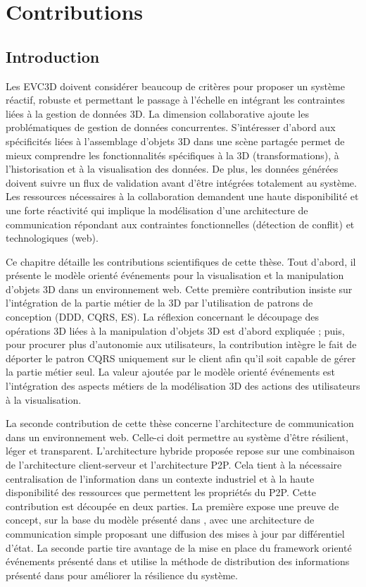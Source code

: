 \chapter{Contributions}
\chaptertable
\section{Introduction}
Les \gls{EVC3D} doivent considérer beaucoup de critères pour 
proposer un système réactif, robuste et permettant le passage à l'échelle en 
intégrant les contraintes liées à la gestion de données \gls{3D}. La dimension 
collaborative ajoute les problématiques de gestion de données concurrentes.
S'intéresser d'abord aux spécificités liées à 
l'assemblage d'objets \gls{3D} dans une scène partagée permet de 
mieux comprendre les fonctionnalités spécifiques à la \gls{3D} (transformations), 
à l'historisation et à la visualisation des données. De plus, les données générées
doivent suivre un flux de validation avant d'être intégrées totalement au système.
Les ressources nécessaires à la collaboration demandent une haute disponibilité 
et une forte réactivité qui implique la modélisation d'une architecture 
de communication répondant aux contraintes fonctionnelles (détection de conflit) 
et technologiques (web).

Ce chapitre détaille les contributions scientifiques de cette thèse.
Tout d'abord, il présente le modèle orienté événements pour la 
visualisation et la manipulation d'objets \gls{3D} dans un environnement web. 
Cette première contribution insiste sur l'intégration de la partie métier de la 
\gls{3D} par l'utilisation de
patrons de conception (\gls{DDD}, \gls{CQRS}, \gls{ES}). La réflexion concernant 
le découpage des opérations \gls{3D} liées à la manipulation d'objets \gls{3D} est 
d'abord expliquée ; puis, pour procurer plus d'autonomie 
aux utilisateurs, la contribution intègre le fait de déporter le patron \gls{CQRS} 
uniquement sur le client afin qu'il soit capable de gérer la partie métier seul. 
La valeur ajoutée par le modèle orienté événements est l'intégration des aspects métiers de la modélisation 3D des actions des utilisateurs à la visualisation. 

La seconde contribution de cette thèse concerne l'architecture de 
communication dans un environnement web. Celle-ci doit 
permettre au système d'être résilient, léger et transparent. 
L'architecture hybride proposée repose sur une combinaison de l'architecture 
client-serveur et l'architecture \gls{P2P}. 
Cela tient à la nécessaire centralisation de l'information dans un 
contexte industriel et à la haute disponibilité des ressources que permettent les propriétés du \gls{P2P}. Cette contribution est découpée en deux parties. La première 
expose une preuve de concept, sur la base du modèle présenté 
dans \cite{Desprat2015a}, avec une architecture de communication simple 
proposant une diffusion des mises à jour par différentiel d'état. La seconde partie 
tire avantage de la mise en place du \gls{framework} orienté événements présenté 
dans 
\cite{Desprat2016} et utilise la méthode de distribution des informations présenté 
dans \cite{Desprat2017} pour améliorer la résilience du système. 

